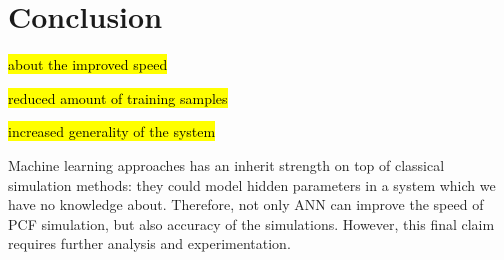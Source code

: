\documentclass[draft, a4, 10pt, onecolumn]{IEEEtran}
\begin{document}
\begin{table}[h]
\centering
{}
\caption{ANN vs Simulation test runtime performance}
\end{table}
\newpage

\section{Conclusion}
\label{sec:conc}

\hl{about the improved speed}

\hl{reduced amount of training samples}

\hl{increased generality of the system}

Machine learning approaches has an inherit strength on top of classical simulation methods: they could model hidden parameters in a system which we have no knowledge about. Therefore, not only ANN can improve the speed of PCF simulation, but also accuracy of the simulations. However, this final claim requires further analysis and experimentation.
	
\end{document}
